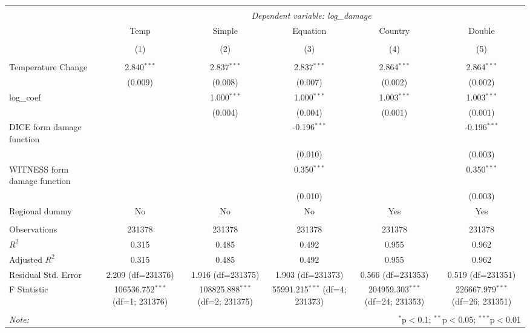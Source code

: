 \begin{table}[!htbp] \centering
\begin{tabular}{@{\extracolsep{5pt}}lccccc}
\\[-1.8ex]\hline
\hline \\[-1.8ex]
& \multicolumn{5}{c}{\textit{Dependent variable: log\_damage}} \
\cr \cline{2-6}
\\[-1.8ex] & \multicolumn{1}{c}{Temp} & \multicolumn{1}{c}{Simple} & \multicolumn{1}{c}{Equation} & \multicolumn{1}{c}{Country} & \multicolumn{1}{c}{Double}  \\
\\[-1.8ex] & (1) & (2) & (3) & (4) & (5) \\
\hline \\[-1.8ex]
 Temperature Change & 2.840$^{***}$ & 2.837$^{***}$ & 2.837$^{***}$ & 2.864$^{***}$ & 2.864$^{***}$ \\
& (0.009) & (0.008) & (0.007) & (0.002) & (0.002) \\[2em]
 log\_coef & & 1.000$^{***}$ & 1.000$^{***}$ & 1.003$^{***}$ & 1.003$^{***}$ \\
& & (0.004) & (0.004) & (0.001) & (0.001) \\[2em]
 DICE form damage function & & & -0.196$^{***}$ & & -0.196$^{***}$ \\
& & & (0.010) & & (0.003) \\[2em]
 WITNESS form damage function & & & 0.350$^{***}$ & & 0.350$^{***}$ \\
& & & (0.010) & & (0.003) \\[2em]
 Regional dummy & No & No & No & Yes & Yes \\
\hline \\[-1.8ex]
 Observations & 231378 & 231378 & 231378 & 231378 & 231378 \\
 $R^2$ & 0.315 & 0.485 & 0.492 & 0.955 & 0.962 \\
 Adjusted $R^2$ & 0.315 & 0.485 & 0.492 & 0.955 & 0.962 \\
 Residual Std. Error & 2.209 (df=231376) & 1.916 (df=231375) & 1.903 (df=231373) & 0.566 (df=231353) & 0.519 (df=231351) \\
 F Statistic & 106536.752$^{***}$ (df=1; 231376) & 108825.888$^{***}$ (df=2; 231375) & 55991.215$^{***}$ (df=4; 231373) & 204959.303$^{***}$ (df=24; 231353) & 226667.979$^{***}$ (df=26; 231351) \\
\hline
\hline \\[-1.8ex]
\textit{Note:} & \multicolumn{5}{r}{$^{*}$p$<$0.1; $^{**}$p$<$0.05; $^{***}$p$<$0.01} \\
\end{tabular}
\end{table}